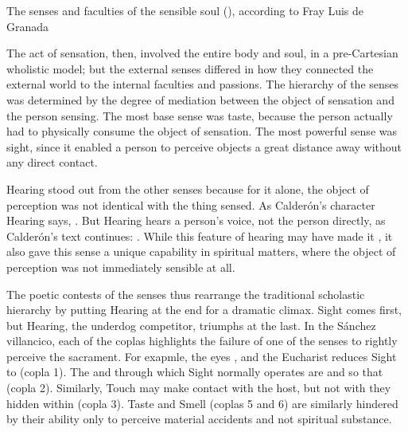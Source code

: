 \begin{table}
  \caption{The senses and faculties of the sensible soul (), according to Fray Luis de Granada}
  \label{table:senses-fray-luis}
\end{table}

The act of sensation, then, involved the entire body and soul, in a pre-Cartesian wholistic model; but the external senses differed in how they connected the external world to the internal faculties and passions.
The hierarchy of the senses was determined by the degree of mediation between the object of sensation and the person sensing.
The most base sense was taste, because the person actually had to physically consume the object of sensation.
The most powerful sense was sight, since it enabled a person to perceive objects a great distance away without any direct contact.

Hearing stood out from the other senses because for it alone, the object of perception was not identical with the thing sensed.
As Calderón's character Hearing says, .%
\autocite[]{Calderon:Retiro}
But Hearing hears a person's voice, not the person directly, as Calderón's text continues: .%
\autocite[]{Calderon:Retiro}
While this feature of hearing may have made it , it also gave this sense a unique capability in spiritual matters, where the object of perception was not immediately sensible at all.

The poetic contests of the senses thus rearrange the traditional scholastic hierarchy by putting Hearing at the end for a dramatic climax.
Sight comes first, but Hearing, the underdog competitor, triumphs at the last.
In the Sánchez villancico, each of the coplas highlights the failure of one of the senses to rightly perceive the sacrament.
For exapmle, the eyes , and the Eucharist reduces Sight to  (copla 1).
The  and  through which Sight normally operates are   and  so that  (copla 2).
Similarly, Touch may make contact with the host, but not with they  hidden within (copla 3).
Taste and Smell (coplas 5 and 6) are similarly hindered by their ability only to perceive material accidents and not spiritual substance.

